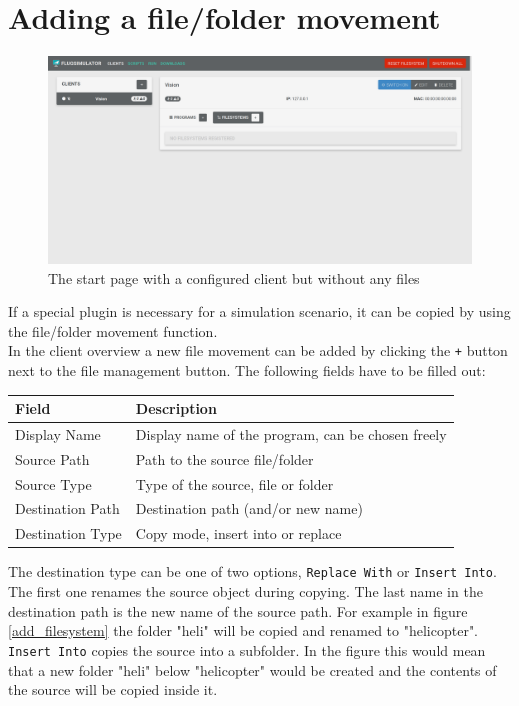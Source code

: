 \documentclass[accentcolor=tud1a, paper=a4, colorback]{tudreport}
\begin{document}
	\section{Adding a file/folder movement}

	\begin{figure}[h]
		\centering
		\includegraphics[width=.9\textwidth]{startpage_without_files}
		\caption{The start page with a configured client but without any files}
		\label{startpage_without_files}
	\end{figure}
	If a special plugin is necessary for a simulation scenario, it can be copied by using
	the file/folder movement function.
	\\
	In the client overview a new file movement can be added by clicking the \texttt{+} button
	next to the file management button. The following fields have to be filled out:
	\\
	\begin{center}
	\begin{tabular}{l|l}
		Field & Description \\\hline
		Display Name &  Display name of the program, can be chosen freely\\
		Source Path & Path to the source file/folder\\
		Source Type & Type of the source, file or folder\\
		Destination Path & Destination path (and/or new name)\\
		Destination Type & Copy mode, insert into or replace\\
	\end{tabular}
	\end{center}
	The destination type can be one of two options, \texttt{Replace With} or \texttt{Insert Into}.
	The first one renames the source object during copying. The last name in the destination path
	is the new name of the source path. For example in figure \ref{add_filesystem} the folder
	"heli" will be copied and renamed to "helicopter".
	\texttt{Insert Into} copies the source into a subfolder. In the figure this would mean that
	a new folder "heli" below "helicopter" would be created and the contents of the source will
	be copied inside it.
\end{document}
